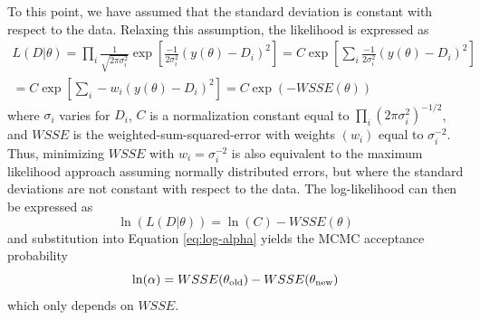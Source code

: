 \documentclass[preprint,review,11pt]{elsarticle}
\begin{document}
	To this point, we have assumed that the standard deviation is constant with respect to the data. Relaxing this assumption, the likelihood is expressed as
	\begin{multline} \label{eq:weighted-likelihood}
	L(D|\theta) = \prod_i \frac{1}{\sqrt{2 \pi \sigma_i^{2}}} \exp\left[\frac{-1}{2\sigma_i^2}(y(\theta)-D_i)^2\right] = C \exp\left[\sum_i\frac{-1}{2\sigma_i^2}(y(\theta)-D_i)^2\right] \\ = C \exp\left[\sum_i-w_i(y(\theta)-D_i)^2\right] = C \exp\left(-WSSE(\theta)\right)
	\end{multline}
	where $\sigma_i$ varies for $D_i$, $C$ is a normalization constant equal to $\prod_i (2 \pi \sigma_i^2)^{-1/2}$, and $WSSE$ is the weighted-sum-squared-error with weights $(w_i)$ equal to $\sigma_i^{-2}$. Thus, minimizing $WSSE$ with $w_i = \sigma_i^{-2}$ is also equivalent to the maximum likelihood approach assuming normally distributed errors, but where the standard deviations are not constant with respect to the data. The log-likelihood can then be expressed as    
	\begin{equation} \label{eq:weighted-log-likelihood}
	\ln(L(D|\theta)) = \ln(C) - WSSE(\theta)
	\end{equation}
	and substitution into Equation \ref{eq:log-alpha} yields the MCMC acceptance probability
	\begin{equation}
	\ln(\alpha) = WSSE(\theta_{\rm old}) - WSSE(\theta_{\rm new})
	\end{equation}
	which only depends on $WSSE$.
	
\end{document}
